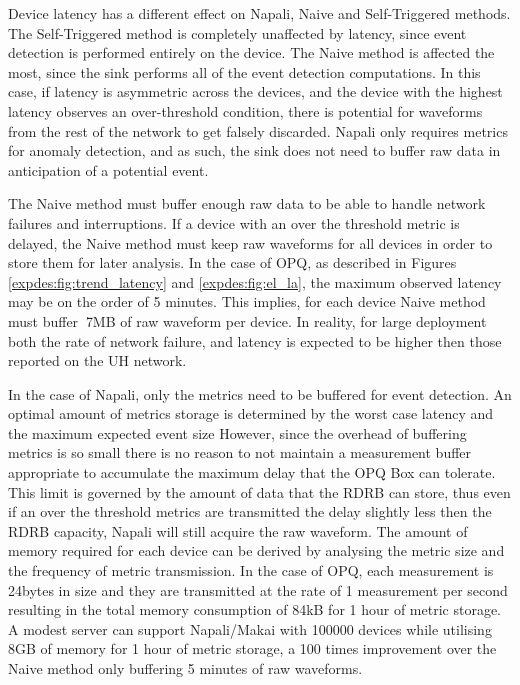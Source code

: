 Device latency has a different effect on Napali, Naive and Self-Triggered methods.
The Self-Triggered method is completely unaffected by latency, since event detection is performed entirely on the device.
The Naive method is affected the most, since the sink performs all of the event detection computations.
In this case, if latency is asymmetric across the devices, and the device with the highest latency observes an over-threshold condition,
there is potential for waveforms from the rest of the network to get falsely discarded.
Napali only requires metrics for anomaly detection, and as such, the sink does not need to buffer raw data in anticipation of a potential event.

The Naive method must buffer enough raw data to be able to handle network failures and interruptions.
If a device with an over the threshold metric is delayed, the Naive method must keep raw waveforms for all devices in order to store them for later analysis.
In the case of OPQ, as described in Figures \ref{expdes:fig:trend_latency} and \ref{expdes:fig:el_la}, the maximum observed latency may be on the order of 5 minutes.
This implies, for each device Naive method must buffer $~$7MB of raw waveform per device.
In reality, for large deployment both the rate of network failure, and latency is expected to be higher then those reported on the UH network.

In the case of Napali, only the metrics need to be buffered for event detection.
An optimal amount of metrics storage is determined by the worst case latency and the maximum expected event size
However, since the overhead of buffering metrics is so small there is no reason to not maintain a measurement buffer appropriate to accumulate the maximum delay that the OPQ Box can tolerate.
This limit is governed by the amount of data that the RDRB can store, thus even if an over the threshold metrics are transmitted the delay slightly less then the RDRB capacity, Napali will still acquire the raw waveform.
The amount of memory required for each device can be derived by analysing the metric size and the frequency of metric transmission.
In the case of OPQ, each measurement is 24bytes in size and they are transmitted at the rate of 1 measurement per second resulting in the total memory consumption of 84kB for 1 hour of metric storage.
A modest server can support Napali/Makai with 100000 devices while utilising 8GB of memory for 1 hour of metric storage, a 100 times improvement over the Naive method only buffering 5 minutes of raw waveforms.


